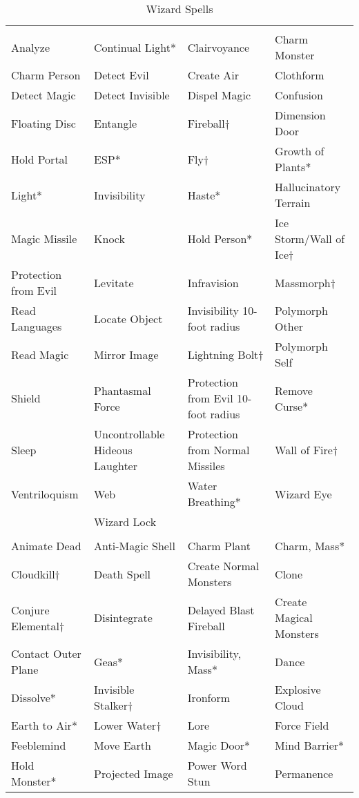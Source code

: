 \begin {table}[H]
  \caption{Wizard Spells}
  \begin{tabularx}{\columnwidth}{XYYY}
	 &  &  & \\
	Analyze & Continual Light* & Clairvoyance & Charm Monster\\
	Charm Person & Detect Evil & Create Air & Clothform\\
	Detect Magic & Detect Invisible & Dispel Magic & Confusion\\
	Floating Disc & Entangle & Fireball† & Dimension Door\\
	Hold Portal & ESP* & Fly† & Growth of Plants*\\
	Light* & Invisibility & Haste* & Hallucinatory Terrain\\
	Magic Missile & Knock & Hold Person* & Ice Storm/Wall of Ice†\\
	Protection from Evil & Levitate & Infravision & Massmorph†\\
	Read Languages & Locate Object & Invisibility 10-foot radius & Polymorph Other\\
	Read Magic & Mirror Image & Lightning Bolt† & Polymorph Self\\
	Shield & Phantasmal Force & Protection from Evil 10-foot radius & Remove Curse*\\
	Sleep & Uncontrollable Hideous Laughter & Protection from Normal Missiles & Wall of Fire†\\
	Ventriloquism & Web & Water Breathing* & Wizard Eye\\
	& Wizard Lock & &\\
	 &  &  & \\
	Animate Dead & Anti-Magic Shell & Charm Plant & Charm, Mass*\\
	Cloudkill† & Death Spell & Create Normal Monsters & Clone\\
	Conjure Elemental† & Disintegrate & Delayed Blast Fireball & Create Magical Monsters\\
	Contact Outer Plane & Geas* & Invisibility, Mass* & Dance\\
	Dissolve* & Invisible Stalker† & Ironform & Explosive Cloud\\
	Earth to Air* & Lower Water† & Lore & Force Field\\
	Feeblemind & Move Earth & Magic Door* & Mind Barrier*\\
	Hold Monster* & Projected Image & Power Word Stun & Permanence\\

\end{tabularx}
\end{table}
